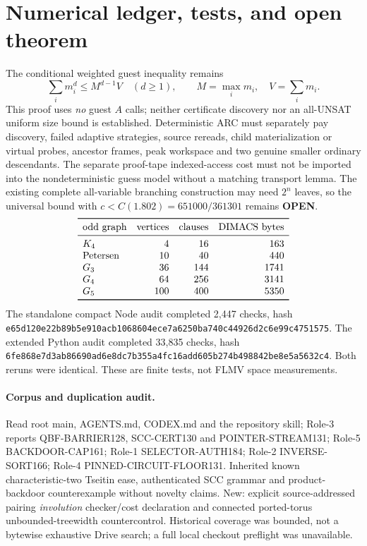 \documentclass[11pt]{article}
\begin{document}
\section{Numerical ledger, tests, and open theorem}
The conditional weighted guest inequality remains
\[
\sum_i m_i^d\le M^{d-1}V\quad(d\ge1),\qquad
M=\max_i m_i,\quad V=\sum_i m_i.
\]
This proof uses \emph{no} guest \(A\) calls; neither certificate discovery nor an all-UNSAT uniform size bound is established. Deterministic ARC must separately pay discovery, failed adaptive strategies, source rereads, child materialization or virtual probes, ancestor frames, peak workspace and two genuine smaller ordinary descendants. The separate proof-tape indexed-access cost must not be imported into the nondeterministic guess model without a matching transport lemma. The existing complete all-variable branching construction may need \(2^n\) leaves, so the universal bound with \(c<C(1.802)=651000/361301\) remains \textbf{OPEN}.
\[
\begin{array}{lrrr}\toprule
\text{odd graph}&\text{vertices}&\text{clauses}&\text{DIMACS bytes}\\\midrule
K_4&4&16&163\\
\text{Petersen}&10&40&440\\
G_3&36&144&1741\\
G_4&64&256&3141\\
G_5&100&400&5350\\\bottomrule
\end{array}
\]
The standalone compact Node audit completed 2,447 checks, hash \texttt{e65d120e22b89b5e910acb1068604ece7a6250ba740c44926d2c6e99c4751575}. The extended Python audit completed 33,835 checks, hash \texttt{6fe868e7d3ab86690ad6e8dc7b355a4fc16add605b274b498842be8e5a5632c4}. Both reruns were identical. These are finite tests, not FLMV space measurements.
\paragraph{Corpus and duplication audit.}
Read root main, AGENTS.md, CODEX.md and the repository skill; Role-3 reports QBF-BARRIER128, SCC-CERT130 and POINTER-STREAM131; Role-5 BACKDOOR-CAP161; Role-1 SELECTOR-AUTH184; Role-2 INVERSE-SORT166; Role-4 PINNED-CIRCUIT-FLOOR131. Inherited known characteristic-two Tseitin ease, authenticated SCC grammar and product-backdoor counterexample without novelty claims. New: explicit source-addressed pairing \emph{involution} checker/cost declaration and connected ported-torus unbounded-treewidth countercontrol. Historical coverage was bounded, not a bytewise exhaustive Drive search; a full local checkout preflight was unavailable.
\end{document}
